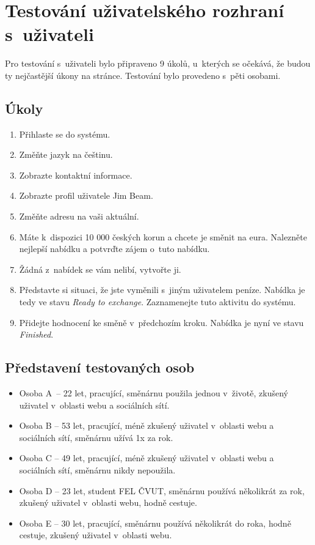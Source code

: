 \section{Testování uživatelského rozhraní s~uživateli}
\label{user-testing}
Pro testování s~uživateli bylo připraveno 9 úkolů, u~kterých se očekává, že budou ty nejčastější úkony na stránce. Testování bylo provedeno s~pěti osobami.
\subsection{Úkoly}

\begin{enumerate}
    \item Přihlaste se do systému.
    \item Změňte jazyk na češtinu.
    \item Zobrazte kontaktní informace.
    \item Zobrazte profil uživatele Jim Beam.
    \item Změňte adresu na vaši aktuální.
    \item Máte k~dispozici 10 000 českých korun a chcete je směnit na eura. Nalezněte nejlepší nabídku a potvrďte zájem o~tuto nabídku.
    \item Žádná z~nabídek se vám nelibí, vytvořte ji.
    \item Představte si situaci, že jste vyměnili s~jiným uživatelem peníze. Nabídka je tedy ve stavu \textit{Ready to exchange}. Zaznamenejte tuto aktivitu do systému.
    \item Přidejte hodnocení ke směně v~předchozím kroku. Nabídka je nyní ve stavu \textit{Finished}.
\end{enumerate}

\subsection{Představení testovaných osob}

\begin{itemize}
    \item Osoba A~-- 22 let, pracující, směnárnu použila jednou v~životě, zkušený uživatel v~oblasti webu a sociálních sítí.
    \item Osoba B -- 53 let, pracující, méně zkušený uživatel v~oblasti webu a sociálních sítí, směnárnu užívá 1x za rok.
    \item Osoba C -- 49 let, pracující, méně zkušený uživatel v~oblasti webu a sociálních sítí, směnárnu nikdy nepoužila.
    \item Osoba D -- 23 let, student FEL ČVUT, směnárnu používá několikrát za rok, zkušený uživatel v~oblasti webu, hodně cestuje.
    \item Osoba E -- 30 let, pracující, směnárnu používá několikrát do roka, hodně cestuje, zkušený uživatel v~oblasti webu.
\end{itemize}

